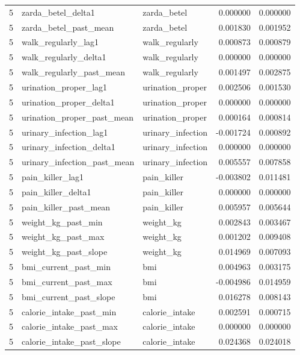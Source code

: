 \begin{longtable}{rllrr}
5 & zarda\_betel\_delta1 & zarda\_betel & 0.000000 & 0.000000 \\
5 & zarda\_betel\_past\_mean & zarda\_betel & 0.001830 & 0.001952 \\
5 & walk\_regularly\_lag1 & walk\_regularly & 0.000873 & 0.000879 \\
5 & walk\_regularly\_delta1 & walk\_regularly & 0.000000 & 0.000000 \\
5 & walk\_regularly\_past\_mean & walk\_regularly & 0.001497 & 0.002875 \\
5 & urination\_proper\_lag1 & urination\_proper & 0.002506 & 0.001530 \\
5 & urination\_proper\_delta1 & urination\_proper & 0.000000 & 0.000000 \\
5 & urination\_proper\_past\_mean & urination\_proper & 0.000164 & 0.000814 \\
5 & urinary\_infection\_lag1 & urinary\_infection & -0.001724 & 0.000892 \\
5 & urinary\_infection\_delta1 & urinary\_infection & 0.000000 & 0.000000 \\
5 & urinary\_infection\_past\_mean & urinary\_infection & 0.005557 & 0.007858 \\
5 & pain\_killer\_lag1 & pain\_killer & -0.003802 & 0.011481 \\
5 & pain\_killer\_delta1 & pain\_killer & 0.000000 & 0.000000 \\
5 & pain\_killer\_past\_mean & pain\_killer & 0.005957 & 0.005644 \\
5 & weight\_kg\_past\_min & weight\_kg & 0.002843 & 0.003467 \\
5 & weight\_kg\_past\_max & weight\_kg & 0.001202 & 0.009408 \\
5 & weight\_kg\_past\_slope & weight\_kg & 0.014969 & 0.007093 \\
5 & bmi\_current\_past\_min & bmi & 0.004963 & 0.003175 \\
5 & bmi\_current\_past\_max & bmi & -0.004986 & 0.014959 \\
5 & bmi\_current\_past\_slope & bmi & 0.016278 & 0.008143 \\
5 & calorie\_intake\_past\_min & calorie\_intake & 0.002591 & 0.000715 \\
5 & calorie\_intake\_past\_max & calorie\_intake & 0.000000 & 0.000000 \\
5 & calorie\_intake\_past\_slope & calorie\_intake & 0.024368 & 0.024018 \\
\end{longtable}
